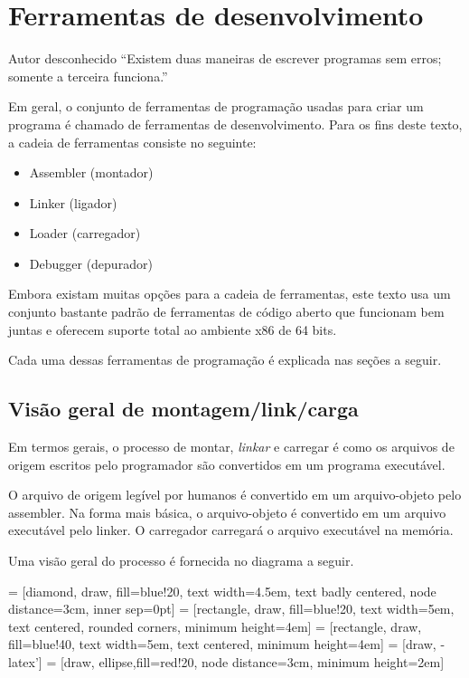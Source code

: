 \chapter{Ferramentas de desenvolvimento}
\label{Ferramentasdedesenvolvimento}

\begin{chapquote}{Autor desconhecido}
``Existem duas maneiras de escrever programas sem erros; somente a terceira funciona.''
\end{chapquote}

Em geral, o conjunto de ferramentas de programação usadas para criar um programa é chamado de ferramentas de desenvolvimento. Para os fins deste texto, a cadeia de ferramentas consiste no seguinte:
\begin{itemize}
	\item Assembler (montador)
	\item Linker (ligador)
	\item Loader (carregador)
	\item Debugger (depurador)
\end{itemize}

Embora existam muitas opções para a cadeia de ferramentas, este texto usa um conjunto bastante padrão de ferramentas de código aberto que funcionam bem juntas e oferecem suporte total ao ambiente x86 de 64 bits.

Cada uma dessas ferramentas de programação é explicada nas seções a seguir.
\section{Visão geral de montagem/link/carga}
Em termos gerais, o processo de montar, \textit{linkar} e carregar é como os arquivos de origem escritos pelo programador são convertidos em um programa executável.

O arquivo de origem legível por humanos é convertido em um arquivo-objeto pelo assembler. Na forma mais básica, o arquivo-objeto é convertido em um arquivo executável pelo linker. O carregador carregará o arquivo executável na memória.

Uma visão geral do processo é fornecida no diagrama a seguir.

 = [diamond, draw, fill=blue!20, 
text width=4.5em, text badly centered, node distance=3cm, inner sep=0pt]
 = [rectangle, draw, fill=blue!20, 
text width=5em, text centered, rounded corners, minimum height=4em]
 = [rectangle, draw, fill=blue!40, 
text width=5em, text centered, minimum height=4em]
 = [draw, -latex']
 = [draw, ellipse,fill=red!20, node distance=3cm,
minimum height=2em]

